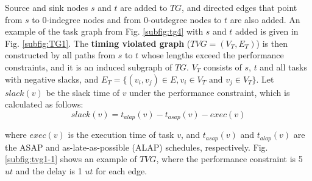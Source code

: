 \documentclass[10pt,journal, compsoc]{IEEEtran}
\begin{document}
Source and sink nodes $s$ and $t$ are added to $TG$, and directed edges that point from $s$ to 0-indegree nodes and from 0-outdegree nodes to $t$ are also added. An example of the task graph from Fig. \ref{subfig:tg4} with $s$ and $t$ added is given in Fig. \ref{subfig:TG1}. The \textbf{timing violated graph} ($TVG=(V_T, E_T)$) is then constructed by all paths from $s$ to $t$ whose lengths exceed the performance constraints, and it is an induced subgraph of $TG$. $V_T$ consists of $s$, $t$ and all tasks with negative slacks, and $E_T=\{(v_i,v_j)\in E, v_i\in V_T \textrm{~and~} v_j\in V_T\}$. Let $slack(v)$ be the slack time of $v$ under the performance constraint, which is calculated as follows:
\begin{equation}
slack(v) = t_{alap}(v)-t_{asap}(v)-exec(v)
\end{equation}

\noindent where $exec(v)$ is the execution time of task $v$, and $t_{asap}(v)$ and $t_{alap}(v)$ are the ASAP and as-late-as-possible (ALAP) schedules, respectively. Fig. \ref{subfig:tvg1-1} shows an example of $TVG$, where the performance constraint is 5 $ut$ and the delay is 1 $ut$ for each edge.
\end{document}
